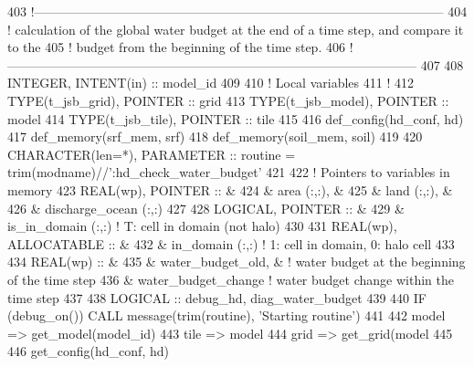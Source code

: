 \begin{DoxyCode}
403   \textcolor{comment}{!------------------------------------------------------------------------------------------------}
404   \textcolor{comment}{! calculation of the global water budget at the end of a time step, and compare it to the}
405   \textcolor{comment}{! budget from the beginning of the time step.}
406   \textcolor{comment}{!------------------------------------------------------------------------------------------------}
407 
408     \textcolor{keywordtype}{INTEGER}, \textcolor{keywordtype}{INTENT(in)} :: model\_id
409 
410     \textcolor{comment}{! Local variables}
411     \textcolor{comment}{!}
412     \textcolor{keywordtype}{TYPE}(t\_jsb\_grid),  \textcolor{keywordtype}{POINTER}    :: grid
413     \textcolor{keywordtype}{TYPE}(t\_jsb\_model), \textcolor{keywordtype}{POINTER}    :: model
414     \textcolor{keywordtype}{TYPE}(t\_jsb\_tile),  \textcolor{keywordtype}{POINTER}    :: tile
415 
416     def\_config(hd\_conf, hd)
417     def\_memory(srf\_mem, srf)
418     def\_memory(soil\_mem, soil)
419 
420     \textcolor{keywordtype}{CHARACTER(len=*)},  \textcolor{keywordtype}{PARAMETER}  :: routine = trim(modname)//\textcolor{stringliteral}{':hd\_check\_water\_budget'}
421 
422     \textcolor{comment}{! Pointers to variables in memory}
423     \textcolor{keywordtype}{REAL(wp)}, \textcolor{keywordtype}{POINTER} ::       &
424       & area            (:,:), &
425       & land            (:,:), &
426       & discharge\_ocean (:,:)
427 
428     \textcolor{keywordtype}{LOGICAL},  \textcolor{keywordtype}{POINTER} ::    &
429       & is\_in\_domain (:,:)      \textcolor{comment}{! T: cell in domain (not halo)}
430 
431     \textcolor{keywordtype}{REAL(wp)}, \textcolor{keywordtype}{ALLOCATABLE}  ::   &
432       & in\_domain       (:,:) \textcolor{comment}{! 1: cell in domain, 0: halo cell}
433 
434     \textcolor{keywordtype}{REAL(wp)} ::             &
435       & water\_budget\_old,   &   \textcolor{comment}{! water budget at the beginning of the time step}
436       & water\_budget\_change     \textcolor{comment}{! water budget change within the time step}
437 
438     \textcolor{keywordtype}{LOGICAL} :: debug\_hd, diag\_water\_budget
439 
440     \textcolor{keywordflow}{IF} (debug\_on()) \textcolor{keyword}{CALL }message(trim(routine), \textcolor{stringliteral}{'Starting routine'})
441 
442     model => get\_model(model\_id)
443     tile => model%
444     grid => get\_grid(model%
445 
446     get\_config(hd\_conf, hd)

\end{DoxyCode}
